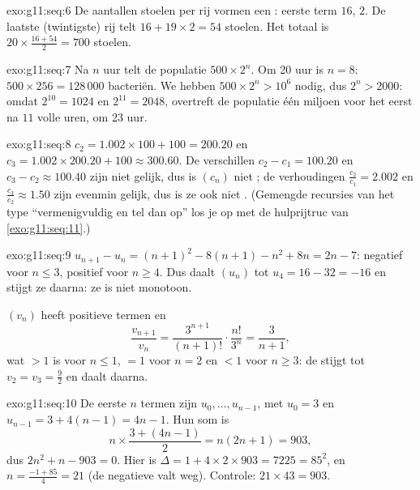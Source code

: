 \begin{solution}{exo:g11:seq:6}
De aantallen stoelen per rij vormen een : eerste term $16$,
 $2$. De laatste (twintigste) rij telt $16 + 19 \times 2 = 54$
stoelen. Het totaal is $20 \times \frac{16 + 54}{2} = 700$ stoelen.
\end{solution}

\begin{solution}{exo:g11:seq:7}
Na $n$ uur telt de populatie $500 \times 2^n$. Om 20 uur is $n = 8$:
$500 \times 256 = 128\,000$ bacteriën. We hebben
$500 \times 2^n > 10^6$ nodig, dus $2^n > 2000$: omdat $2^{10} = 1024$ en
$2^{11} = 2048$, overtreft de populatie één miljoen voor het eerst na $11$
volle uren, om 23 uur.
\end{solution}

\begin{solution}{exo:g11:seq:8}
$c_2 = 1.002 \times 100 + 100 = 200.20$ en
$c_3 = 1.002 \times 200.20 + 100 \approx 300.60$. De verschillen
$c_2 - c_1 = 100.20$ en $c_3 - c_2 \approx 100.40$ zijn niet gelijk, dus is
$(c_n)$ niet ; de verhoudingen $\frac{c_2}{c_1} = 2.002$ en
$\frac{c_3}{c_2} \approx 1.50$ zijn evenmin gelijk, dus is ze ook niet
. (Gemengde recursies van het type ``vermenigvuldig en tel dan
op'' los je op met de hulprijtruc van \cref{exo:g11:seq:11}.)
\end{solution}

\begin{solution}{exo:g11:seq:9}
$u_{n+1} - u_n = (n+1)^2 - 8(n+1) - n^2 + 8n = 2n - 7$: negatief voor
$n \leq 3$, positief voor $n \geq 4$. Dus daalt $(u_n)$ tot
$u_4 = 16 - 32 = -16$ en stijgt ze daarna: ze is niet monotoon.

$(v_n)$ heeft positieve termen en
\[
\frac{v_{n+1}}{v_n} = \frac{3^{n+1}}{(n+1)!} \cdot \frac{n!}{3^n}
= \frac{3}{n+1},
\]
wat $> 1$ is voor $n \leq 1$, $= 1$ voor $n = 2$ en $< 1$ voor $n \geq 3$:
de  stijgt tot $v_2 = v_3 = \frac92$ en daalt daarna.
\end{solution}

\begin{solution}{exo:g11:seq:10}
De eerste $n$ termen zijn $u_0, \dots, u_{n-1}$, met $u_0 = 3$ en
$u_{n-1} = 3 + 4(n-1) = 4n - 1$. Hun som is
\[
n \times \frac{3 + (4n-1)}{2} = n(2n + 1) = 903,
\]
dus $2n^2 + n - 903 = 0$. Hier is $\Delta = 1 + 4 \times 2 \times 903 =
7225 = 85^2$, en $n = \frac{-1 + 85}{4} = 21$ (de negatieve  valt
weg). Controle: $21 \times 43 = 903$.
\end{solution}


